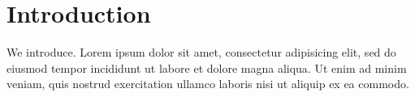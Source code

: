 \section{Introduction}
\label{sec:intro}

We introduce. Lorem ipsum dolor sit amet, consectetur adipisicing
elit, sed do eiusmod tempor incididunt ut labore et dolore magna
aliqua. Ut enim ad minim veniam, quis nostrud exercitation ullamco
laboris nisi ut aliquip ex ea commodo.

